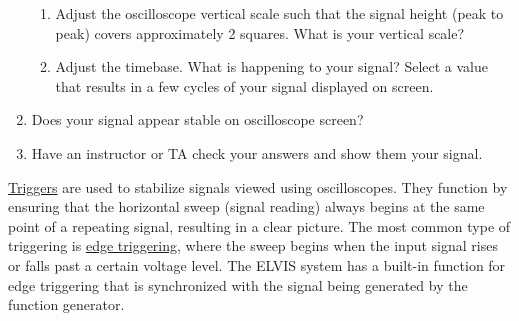 \documentclass{article}
\begin{document}
\begin{enumerate}
\begin{enumerate}
			\item Adjust the oscilloscope vertical scale such that the signal height (peak to peak) covers approximately 2 squares. What is your vertical scale?
			\item Adjust the timebase. What is happening to your signal? Select a value that results in a few cycles of your signal displayed on screen.
		\end{enumerate}
	\item Does your signal appear stable on oscilloscope screen?
	\item Have an instructor or TA check your answers and show them your signal.
\end{enumerate}

\underline{Triggers} are used to stabilize signals viewed using oscilloscopes. They function by ensuring that the horizontal sweep (signal reading) always begins at the same point of a repeating signal, resulting in a clear picture. The most common type of triggering is \underline{edge triggering}, where the sweep begins when the input signal rises or falls past a certain voltage level. The ELVIS system has a built-in function for edge triggering that is synchronized with the signal being generated by the function generator.\\
\end{document}
